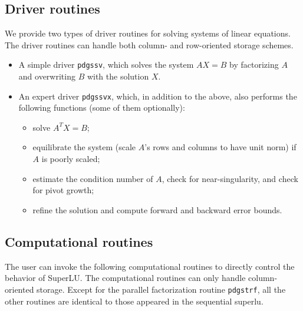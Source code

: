 \subsection{Driver routines}
We provide two types of driver routines for solving systems of 
linear equations. The driver routines can handle both column-
and row-oriented storage schemes.
\begin{itemize}
\item A simple driver {\tt pdgssv}, which solves the system $AX=B$ by 
      factorizing $A$ and overwriting $B$ with the solution $X$. 
\item An expert driver {\tt pdgssvx}, which, in addition to the above, also 
      performs the following functions (some of them optionally):
      \begin{itemize}
      \item solve $A^TX=B$;
      \item equilibrate the system (scale $A$'s rows and columns to have
		unit norm) if $A$ is poorly scaled;
      \item estimate the condition number of $A$, check for near-singularity,
            and check for pivot growth;
      \item refine the solution and compute forward and backward error bounds.
      \end{itemize}
\end{itemize}

\subsection{Computational routines}
The user can invoke the following computational routines
to directly control the behavior of SuperLU.
The computational routines can only handle column-oriented storage.
Except for the parallel factorization routine {\tt pdgstrf}, all the other
routines are identical to those appeared in the sequential superlu.

